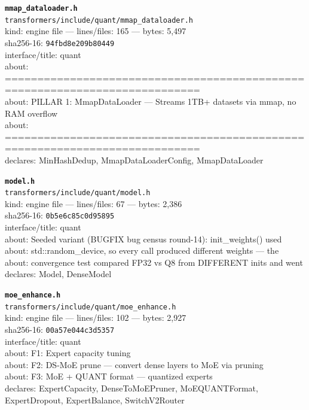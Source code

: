 \noindent\textbf{\texttt{mmap\_dataloader.h}}\\
\texttt{transformers/include/quant/mmap\_dataloader.h}\\
kind: engine file --- lines/files: 165 --- bytes: 5,497\\
sha256-16: \texttt{94fbd8e209b80449}\\
interface/title: quant\\
about: ============================================================================\\
about: PILLAR 1: MmapDataLoader — Streams 1TB+ datasets via mmap, no RAM overflow\\
about: ============================================================================\\
declares: MinHashDedup, MmapDataLoaderConfig, MmapDataLoader\\
\vspace*{6.0pt}

\noindent\textbf{\texttt{model.h}}\\
\texttt{transformers/include/quant/model.h}\\
kind: engine file --- lines/files: 67 --- bytes: 2,386\\
sha256-16: \texttt{0b5e6c85c0d95895}\\
interface/title: quant\\
about: Seeded variant (BUGFIX bug census round-14): init\_weights() used\\
about: std::random\_device, so every call produced different weights — the\\
about: convergence test compared FP32 vs Q8 from DIFFERENT inits and went\\
declares: Model, DenseModel\\
\vspace*{6.0pt}
\newpage

\noindent\textbf{\texttt{moe\_enhance.h}}\\
\texttt{transformers/include/quant/moe\_enhance.h}\\
kind: engine file --- lines/files: 102 --- bytes: 2,927\\
sha256-16: \texttt{00a57e044c3d5357}\\
interface/title: quant\\
about: F1: Expert capacity tuning\\
about: F2: DS-MoE prune — convert dense layers to MoE via pruning\\
about: F3: MoE + QUANT format — quantized experts\\
declares: ExpertCapacity, DenseToMoEPruner, MoEQUANTFormat, ExpertDropout, ExpertBalance, SwitchV2Router\\
\vspace*{6.0pt}


